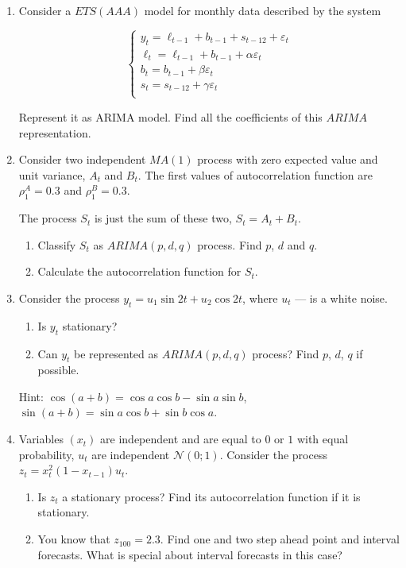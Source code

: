 \documentclass[12pt]{article}
\def \cN{\mathcal{N}}
\begin{document}
\begin{enumerate}
\item Consider a $ETS(AAA)$ model for monthly data described by the system

\[
\begin{cases}
y_t = \ell_{t-1} + b_{t-1} + s_{t-12} +  \varepsilon_t \\
\ell_t = \ell_{t-1} + b_{t-1} + \alpha \varepsilon_t \\
b_t = b_{t-1} + \beta \varepsilon_t \\
s_t = s_{t-12} + \gamma \varepsilon_t \\
\end{cases}
\]

Represent it as ARIMA model. Find all the coefficients of this $ARIMA$ representation.


\newpage
\item Consider two independent $MA(1)$ process with zero expected value and unit variance, $A_t$ and $B_t$.
The first values of autocorrelation function are $\rho_1^A = 0.3$ and $\rho_1^B=0.3$.

The process $S_t$ is just the sum of these two, $S_t = A_t + B_t$.

\begin{enumerate}
	\item Classify $S_t$ as $ARIMA(p, d, q)$ process. Find $p$, $d$ and $q$.
	\item Calculate the autocorrelation function for $S_t$. 
\end{enumerate}

\item Consider the process $y_t = u_1 \sin 2t + u_2 \cos 2t$, where $u_t$ — is a white noise.

\begin{enumerate}
	\item Is $y_t$ stationary?
	\item Can $y_t$ be represented as $ARIMA(p, d, q)$ process? Find $p$, $d$, $q$ if possible.
\end{enumerate}

Hint: $\cos(a+b) = \cos a \cos b - \sin a \sin b$, $\sin (a + b) = \sin a \cos b + \sin b \cos a$. 


\item Variables $(x_t)$ are independent and are equal to $0$ or $1$ with equal probability, 
$u_t$ are independent $\cN(0; 1)$. Consider the process $z_t = x_t^2 (1-x_{t-1}) u_t$.

\begin{enumerate}
	\item Is $z_t$ a stationary process? Find its autocorrelation function if it is stationary.
	\item You know that $z_{100} = 2.3$. Find one and two step ahead point and interval forecasts.
	What is special about interval forecasts in this case?
\end{enumerate}


\end{enumerate}
\end{document}
